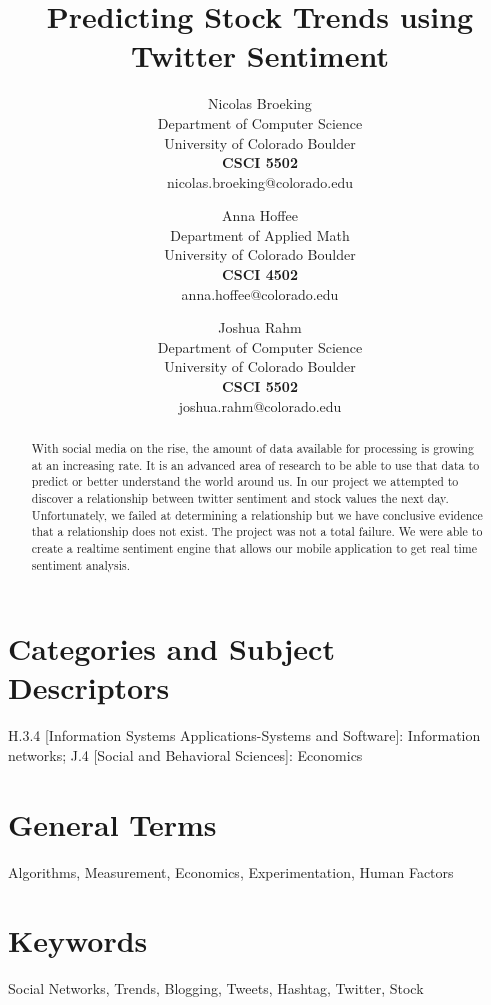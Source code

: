 \documentclass{acm_proc_article-sp}
\title{Predicting Stock Trends using Twitter Sentiment}
\author{
    Nicolas Broeking \\
    \small Department of Computer Science \\
    \small University of Colorado Boulder \\
    \small \textbf{CSCI 5502} \\
    \small nicolas.broeking@colorado.edu \\
    \and
    Anna Hoffee \\
    \small Department of Applied Math \\
    \small University of Colorado Boulder \\
    \small \textbf{CSCI 4502} \\
    \small anna.hoffee@colorado.edu \\
    \and
    Joshua Rahm \\
    \small Department of Computer Science \\
    \small University of Colorado Boulder \\
    \small \textbf{CSCI 5502} \\
    \small joshua.rahm@colorado.edu \\
}
\begin{document}

\maketitle

\begin{abstract} 

With social media on the rise, the amount of data available
for processing is growing at an increasing rate. It is an advanced area of
research to be able to use that data to predict or better understand the world
around us. In our project we attempted to discover a relationship between
twitter sentiment and stock values the next day. Unfortunately, we failed at
determining a relationship but we have conclusive evidence that a relationship
does not exist. The project was not a total failure. We were able to create a
realtime sentiment engine that allows our mobile application to get real time
sentiment analysis.

\end{abstract}

\section*{Categories and Subject\\ Descriptors}

H.3.4 [Information Systems Applications-Systems and Software]: Information
networks; J.4 [Social and Behavioral Sciences]: Economics

\section*{General Terms}
Algorithms, Measurement, Economics, Experimentation, Human Factors

\section*{Keywords}

Social Networks, Trends, Blogging, Tweets, Hashtag, Twitter, Stock
\end{document}
